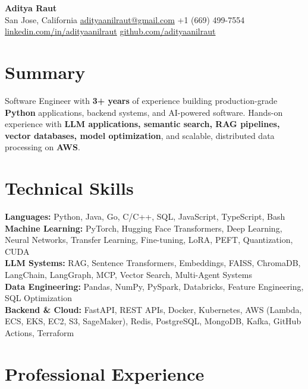 \documentclass[10pt]{article}
\begin{document}
\begin{center}
{\LARGE\textbf{Aditya Raut}}\\[2pt]
San Jose, California \textbar{}
\href{mailto:adityaanilraut@gmail.com}{adityaanilraut@gmail.com} \textbar{}
+1 (669) 499-7554 \textbar{}
\href{https://linkedin.com/in/adityaanilraut}{linkedin.com/in/adityaanilraut} \textbar{}
\href{https://github.com/adityaanilraut}{github.com/adityaanilraut}
\end{center}


\section*{Summary}

Software Engineer with \textbf{3+ years} of experience building production-grade \textbf{Python} applications, backend systems, and AI-powered software. Hands-on experience with \textbf{LLM applications, semantic search, RAG pipelines, vector databases, model optimization}, and scalable, distributed data processing on \textbf{AWS}.


\section*{Technical Skills}

\textbf{Languages:} Python, Java, Go, C/C++, SQL, JavaScript, TypeScript, Bash \\
\textbf{Machine Learning:} PyTorch, Hugging Face Transformers, Deep Learning, Neural Networks, Transfer Learning, Fine-tuning, LoRA, PEFT, Quantization, CUDA \\
\textbf{LLM Systems:} RAG, Sentence Transformers, Embeddings, FAISS, ChromaDB, LangChain, LangGraph, MCP, Vector Search, Multi-Agent Systems \\
\textbf{Data Engineering:} Pandas, NumPy, PySpark, Databricks, Feature Engineering, SQL Optimization \\
\textbf{Backend \& Cloud:} FastAPI, REST APIs, Docker, Kubernetes, AWS (Lambda, ECS, EKS, EC2, S3, SageMaker), Redis, PostgreSQL, MongoDB, Kafka, GitHub Actions, Terraform


\section*{Professional Experience}
\end{document}
